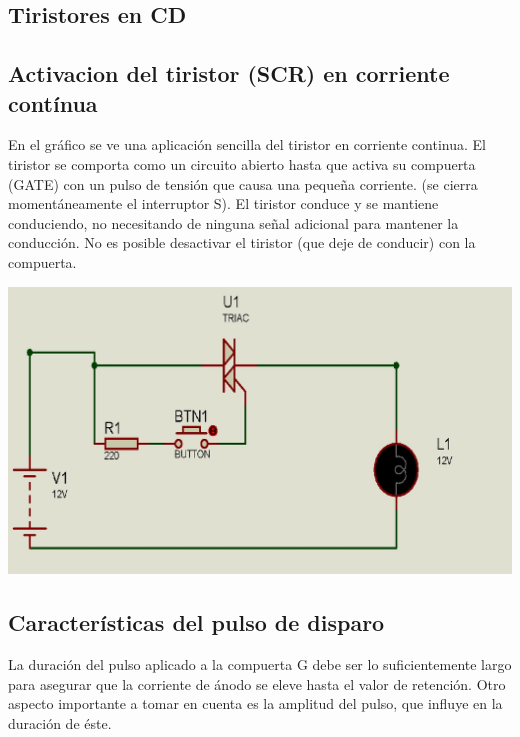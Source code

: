 \documentclass[12pt,a4paper]{article}
\begin{document}
\newpage
\begin{flushleft}
\section{Tiristores en CD}
\subsection{Activacion del tiristor (SCR) en corriente contínua}
\end{flushleft}
\begin{flushleft}
En el gráfico se ve una aplicación sencilla del tiristor en corriente continua. El tiristor se comporta como un circuito abierto hasta que activa su compuerta (GATE) con un pulso de tensión que causa una pequeña corriente. (se cierra momentáneamente el interruptor S). El tiristor conduce y se mantiene conduciendo, no necesitando de ninguna señal adicional para mantener la conducción. No es posible desactivar el tiristor (que deje de conducir) con la compuerta.\\
\end{flushleft}
\begin{center}
\includegraphics[scale=0.4]{imagenes/tiristor3.JPG} 
\subsection{Características del pulso de disparo}
\end{center}
\begin{flushleft}La duración del pulso aplicado a la compuerta G debe ser lo suficientemente largo para asegurar que la corriente de ánodo se eleve hasta el valor de retención. Otro aspecto importante a tomar en cuenta es la amplitud del pulso, que influye en la duración de éste.\newline
\end{flushleft}
\end{document}
